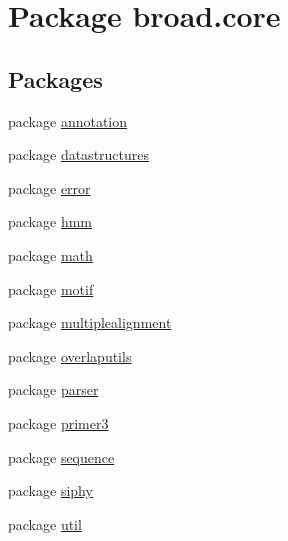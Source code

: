 \hypertarget{namespacebroad_1_1core}{\section{Package broad.\+core}
\label{namespacebroad_1_1core}
}
\subsection*{Packages}
\begin{DoxyCompactItemize}
\item 
package \hyperlink{namespacebroad_1_1core_1_1annotation}{annotation}
\item 
package \hyperlink{namespacebroad_1_1core_1_1datastructures}{datastructures}
\item 
package \hyperlink{namespacebroad_1_1core_1_1error}{error}
\item 
package \hyperlink{namespacebroad_1_1core_1_1hmm}{hmm}
\item 
package \hyperlink{namespacebroad_1_1core_1_1math}{math}
\item 
package \hyperlink{namespacebroad_1_1core_1_1motif}{motif}
\item 
package \hyperlink{namespacebroad_1_1core_1_1multiplealignment}{multiplealignment}
\item 
package \hyperlink{namespacebroad_1_1core_1_1overlaputils}{overlaputils}
\item 
package \hyperlink{namespacebroad_1_1core_1_1parser}{parser}
\item 
package \hyperlink{namespacebroad_1_1core_1_1primer3}{primer3}
\item 
package \hyperlink{namespacebroad_1_1core_1_1sequence}{sequence}
\item 
package \hyperlink{namespacebroad_1_1core_1_1siphy}{siphy}
\item 
package \hyperlink{namespacebroad_1_1core_1_1util}{util}
\end{DoxyCompactItemize}
